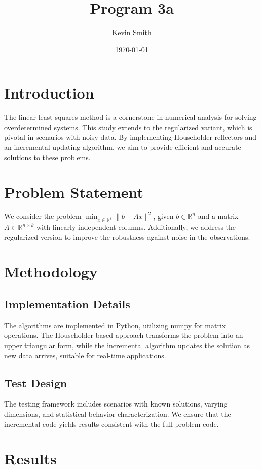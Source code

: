 \documentclass{article}
\title{Program 3a}
\author{Kevin Smith}
\date{\today}
\begin{document}
\maketitle

\section{Introduction}
The linear least squares method is a cornerstone in numerical analysis for solving overdetermined systems. This study extends to the regularized variant, which is pivotal in scenarios with noisy data. By implementing Householder reflectors and an incremental updating algorithm, we aim to provide efficient and accurate solutions to these problems.

\section{Problem Statement}
We consider the problem $\min_{x \in \mathbb{R}^k} \|b - Ax\|^2$, given $b \in \mathbb{R}^n$ and a matrix $A \in \mathbb{R}^{n \times k}$ with linearly independent columns. Additionally, we address the regularized version to improve the robustness against noise in the observations.

\section{Methodology}
\subsection{Implementation Details}
The algorithms are implemented in Python, utilizing numpy for matrix operations. The Householder-based approach transforms the problem into an upper triangular form, while the incremental algorithm updates the solution as new data arrives, suitable for real-time applications.

\subsection{Test Design}
The testing framework includes scenarios with known solutions, varying dimensions, and statistical behavior characterization. We ensure that the incremental code yields results consistent with the full-problem code.

\section{Results}
\end{document}
